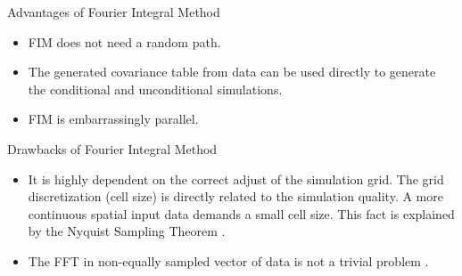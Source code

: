 \begin{frame}{Advantages of Fourier Integral Method}
\begin{itemize}
	\item FIM does not need a random path.
    \item The generated covariance table from data can be used directly to generate the conditional and unconditional simulations.
    \item FIM is embarrassingly parallel.
\end{itemize}
\end{frame}

\begin{frame}{Drawbacks of Fourier Integral Method}
\begin{itemize}
	\item It  is highly dependent on the correct adjust of the simulation grid. The grid discretization (cell size) is directly related to the simulation quality. A more continuous spatial input data demands a small cell size. This fact is explained by the Nyquist Sampling Theorem \cite{pardo1993fourier}. 
    \item The FFT in non-equally sampled vector of data is not a trivial problem \cite{keiner2009using}.
\end{itemize}
\end{frame}




